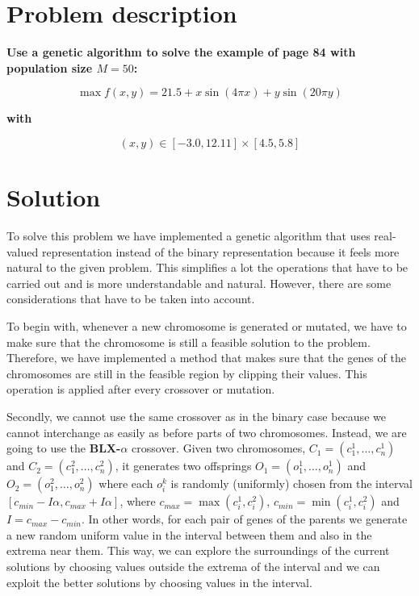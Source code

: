 \documentclass[11pt]{article}
\begin{document}
\setlength{\parskip}{1em}

    
    

    
    \hypertarget{problem-description}{%
\section{Problem description}}

\textbf{Use a genetic algorithm to solve the example of page 84 with
population size \(M = 50\):}

\[ \max f(x,y) = 21.5 + x \sin(4\pi x) + y\sin(20\pi y) \]

\textbf{with}

\[(x, y) \in [-3.0, 12.11] \times [4.5, 5.8]\]

\hypertarget{solution}{%
\section{Solution}}

To solve this problem we have implemented a genetic algorithm that uses
real-valued representation instead of the binary representation because
it feels more natural to the given problem. This simplifies a lot the
operations that have to be carried out and is more understandable and
natural. However, there are some considerations that have to be taken
into account.

To begin with, whenever a new chromosome is generated or mutated, we
have to make sure that the chromosome is still a feasible solution to
the problem. Therefore, we have implemented a method that makes sure
that the genes of the chromosomes are still in the feasible region by
clipping their values. This operation is applied after every crossover
or mutation.

Secondly, we cannot use the same crossover as in the binary case because
we cannot interchange as easily as before parts of two chromosomes.
Instead, we are going to use the \textbf{BLX-\(\alpha\)} crossover.
Given two chromosomes, \(C_1 = (c_1^1, \dots, c_n^1)\) and
\(C_2 = (c_1^2, \dots, c_n^2)\), it generates two offsprings
\(O_1 = (o_1^1, \dots, o_n^1)\) and \(O_2 = (o_1^2, \dots, o_n^2)\)
where each \(o_i^k\) is randomly (uniformly) chosen from the interval
\([c_{min} - I\alpha, c_{max} + I\alpha]\), where
\(c_{max} = \max(c_i^1, c_i^2)\), \(c_{min} = \min(c_i^1, c_i^2)\) and
\(I = c_{max} - c_{min}\). In other words, for each pair of genes of the
parents we generate a new random uniform value in the interval between
them and also in the extrema near them. This way, we can explore the
surroundings of the current solutions by choosing values outside the
extrema of the interval and we can exploit the better solutions by
choosing values in the interval.
\end{document}
